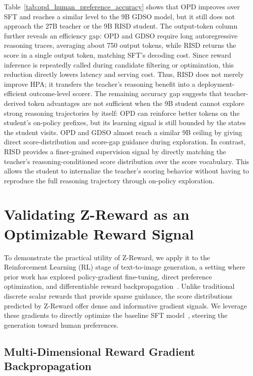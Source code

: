 \documentclass{article}
\newcommand{\mname}{Z-Reward\xspace}
\newcommand{\teaname}{GDSO\xspace}
\newcommand{\stuname}{RISD\xspace}
\begin{document}
Table~\ref{tab:opd_human_preference_accuracy} shows that OPD improves over SFT and reaches a similar level to the 9B \teaname model, but it still does not approach the 27B teacher or the 9B \stuname student.
The output-token column further reveals an efficiency gap: OPD and \teaname require long autoregressive reasoning traces, averaging about 750 output tokens, while \stuname returns the score in a single output token, matching SFT's decoding cost. Since reward inference is repeatedly called during candidate filtering or optimization, this reduction directly lowers latency and serving cost. Thus, \stuname does not merely improve HPA; it transfers the teacher's reasoning benefit into a deployment-efficient outcome-level scorer. The remaining accuracy gap suggests that teacher-derived token advantages are not sufficient when the 9B student cannot explore strong reasoning trajectories by itself: OPD can reinforce better tokens on the student's on-policy prefixes, but its learning signal is still bounded by the states the student visits. OPD and \teaname almost reach a similar 9B ceiling by giving direct score-distribution and score-gap guidance during exploration. In contrast, \stuname provides a finer-grained supervision signal by directly matching the teacher's reasoning-conditioned score distribution over the score vocabulary. This allows the student to internalize the teacher's scoring behavior without having to reproduce the full reasoning trajectory through on-policy exploration.


\section{Validating \mname as an Optimizable Reward Signal}
\label{sec:reward_feedback_learning} 


To demonstrate the practical utility of \mname, we apply it to the Reinforcement Learning (RL) stage of text-to-image generation, a setting where prior work has explored policy-gradient fine-tuning, direct preference optimization, and differentiable reward backpropagation~\cite{fan2023dpok,wallace2024diffusion,prabhudesai2024alignprop,clark2024directlyfinetuningdiffusionmodels}. Unlike traditional discrete scalar rewards that provide sparse guidance, the score distributions predicted by \mname offer dense and informative gradient signals. We leverage these gradients to directly optimize the baseline SFT model~\cite{Team2025ZImageAE}, steering the generation toward human preferences.

\subsection{Multi-Dimensional Reward Gradient Backpropagation}
\end{document}
